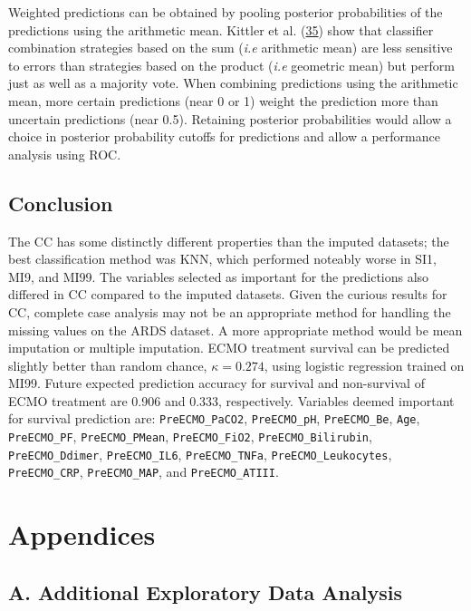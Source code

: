 \documentclass[12pt,]{article}
\begin{document}
Weighted predictions can be obtained by pooling posterior probabilities
of the predictions using the arithmetic mean. Kittler et al.
(\protect\hyperlink{ref-kittler_combining_1996}{35}) show that
classifier combination strategies based on the sum (\emph{i.e}
arithmetic mean) are less sensitive to errors than strategies based on
the product (\emph{i.e} geometric mean) but perform just as well as a
majority vote. When combining predictions using the arithmetic mean,
more certain predictions (near 0 or 1) weight the prediction more than
uncertain predictions (near 0.5). Retaining posterior probabilities
would allow a choice in posterior probability cutoffs for predictions
and allow a performance analysis using ROC.

\subsection{Conclusion}\label{conclusion}

The CC has some distinctly different properties than the imputed
datasets; the best classification method was KNN, which performed
noteably worse in SI1, MI9, and MI99. The variables selected as
important for the predictions also differed in CC compared to the
imputed datasets. Given the curious results for CC, complete case
analysis may not be an appropriate method for handling the missing
values on the ARDS dataset. A more appropriate method would be mean
imputation or multiple imputation. ECMO treatment survival can be
predicted slightly better than random chance, \(\kappa=0.274\), using
logistic regression trained on MI99. Future expected prediction accuracy
for survival and non-survival of ECMO treatment are 0.906 and 0.333,
respectively. Variables deemed important for survival prediction are:
\texttt{PreECMO\_PaCO2}, \texttt{PreECMO\_pH}, \texttt{PreECMO\_Be},
\texttt{Age}, \texttt{PreECMO\_PF}, \texttt{PreECMO\_PMean},
\texttt{PreECMO\_FiO2}, \texttt{PreECMO\_Bilirubin},
\texttt{PreECMO\_Ddimer}, \texttt{PreECMO\_IL6}, \texttt{PreECMO\_TNFa},
\texttt{PreECMO\_Leukocytes}, \texttt{PreECMO\_CRP},
\texttt{PreECMO\_MAP}, and \texttt{PreECMO\_ATIII}.

\newpage

\section*{Appendices}\label{appendices}

\subsection*{A. Additional Exploratory Data
Analysis}\label{a.-additional-exploratory-data-analysis}
\end{document}
